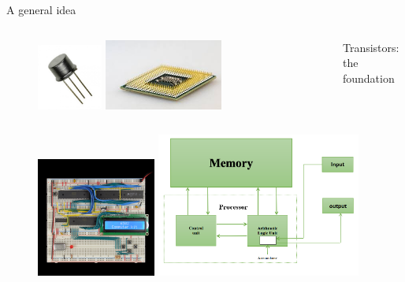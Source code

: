 \documentclass[10pt]{beamer}
\renewcommand{\[}{\begin{equation*}}
\renewcommand{\]}{\end{equation*}}
\begin{document}
\begin{frame}{A general idea}
\begin{columns}
\begin{column}{0.3\textwidth}
\newline
\begin{figure}
\centering
\includegraphics[width=0.25\textwidth]{Notes/Figures/transistor.jpg}
\includegraphics[width=0.45\textwidth]{Notes/Figures/cpu.jpeg}

\end{figure}
\end{column}

\begin{column}{0.7\textwidth}
Transistors: the foundation
\end{column}
\end{columns}
\pause
\begin{figure}
\centering
\includegraphics[width=0.35\textwidth]{Notes/Figures/6502_280x420.png}
\includegraphics[width=0.6\textwidth]{Notes/Figures/cpu_diagram.png}
\end{figure}
\end{frame}
\end{document}

